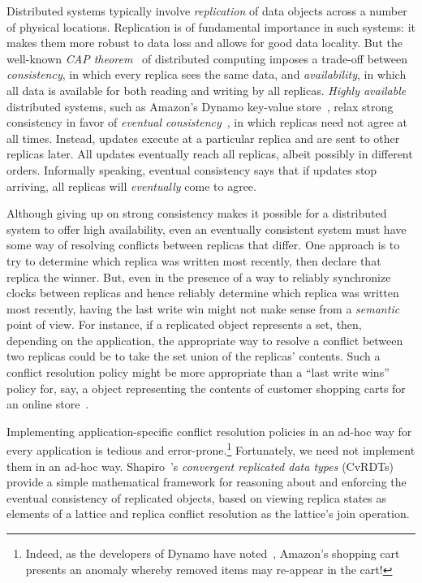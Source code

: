 Distributed systems typically involve \emph{replication} of data
objects across a number of physical locations.  Replication is of
fundamental importance in such systems: it makes them more robust to
data loss and allows for good data locality.  But the well-known
\emph{CAP theorem}~\cite{gilbert-lynch-cap, BrewerCAPBlog} of
distributed computing imposes a trade-off between \emph{consistency},
in which every replica sees the same data, and \emph{availability}, in
which all data is available for both reading and writing by all
replicas.  \emph{Highly available} distributed systems, such as
Amazon's Dynamo key-value store~\cite{dynamo}, relax strong
consistency in favor of \emph{eventual consistency}~\cite{vogels-ec},
in which replicas need not agree at all times.  Instead, updates
execute at a particular replica and are sent to other replicas
later. All updates eventually reach all replicas, albeit possibly in
different orders.  Informally speaking, eventual consistency says that
if updates stop arriving, all replicas will \emph{eventually} come to
agree.

Although giving up on strong consistency makes it possible for a
distributed system to offer high availability, even an eventually
consistent system must have some way of resolving conflicts between
replicas that differ.  One approach is to try to determine which
replica was written most recently, then declare that replica the
winner.  But, even in the presence of a way to reliably synchronize
clocks between replicas and hence reliably determine which replica was
written most recently, having the last write win might not make sense
from a \emph{semantic} point of view.  For instance, if a replicated
object represents a set, then, depending on the application, the
appropriate way to resolve a conflict between two replicas could be to
take the set union of the replicas' contents.  Such a conflict
resolution policy might be more appropriate than a ``last write wins''
policy for, say, a object representing the contents of customer
shopping carts for an online store~\cite{dynamo}.

Implementing application-specific conflict resolution policies in an
ad-hoc way for every application is tedious and
error-prone.\footnote{Indeed, as the developers of Dynamo have
  noted~\cite{dynamo}, Amazon's shopping cart presents an anomaly
  whereby removed items may re-appear in the cart!}  Fortunately, we
need not implement them in an ad-hoc way. Shapiro~\etal's
\emph{convergent replicated data types} (CvRDTs)~\cite{crdts,crdts-tr}
provide a simple mathematical framework for reasoning about and
enforcing the eventual consistency of replicated objects, based on
viewing replica states as elements of a lattice and replica conflict
resolution as the lattice's join operation.


